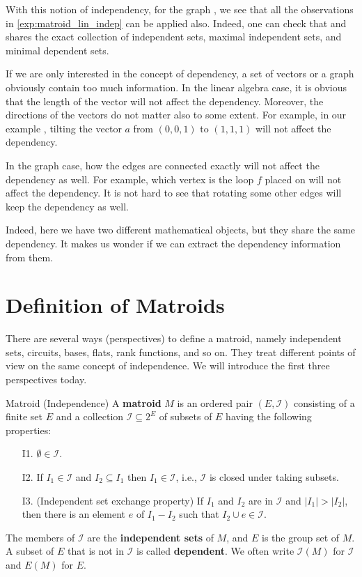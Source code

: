 \documentclass[a4paper,10pt]{article}
\renewcommand{\vocab}[1]{\textbf{#1}}
\newcommand{\II}{\mathcal{I}}
\begin{document}
With this notion of independency, for the graph , we see that all the observations in \cref{exp:matroid_lin_indep} can be applied also. Indeed, one can check that  and  shares the exact collection of independent sets, maximal independent sets, and minimal dependent sets.


If we are only interested in the concept of dependency, a set of vectors or a graph obviously contain too much information. In the linear algebra case, it is obvious that the length of the vector will not affect the dependency. Moreover, the directions of the vectors do not matter also to some extent. For example, in our example , tilting the vector $a$ from $(0,0,1)$ to $(1,1,1)$ will not affect the dependency. 

In the graph case, how the edges are connected exactly will not affect the dependency as well. For example, which vertex is the loop $f$ placed on will not affect the dependency. It is not hard to see that rotating some other edges will keep the dependency as well.

Indeed, here we have two different mathematical objects, but they share the same dependency. It makes us wonder if we can extract the dependency information from them.

\section{Definition of Matroids}

There are several ways (perspectives) to define a matroid, namely independent sets, circuits, bases, flats, rank functions, and so on. They treat different points of view on the same concept of independence. We will introduce the first three perspectives today.


\begin{definition}{Matroid (Independence)}
  A \vocab{matroid} $M$ is an ordered pair $(E,\II)$ consisting of a finite set $E$ and a collection $\II\subseteq 2^E$ of subsets of $E$ having the following properties:
  \begin{enumerate}
    \item [I1.] $\emptyset \in \II$.
    \item [I2.] If $I_1\in \II$ and $I_2\subseteq I_1$ then $I_1\in \II$, i.e., $\II$ is closed under taking subsets.
    \item [I3.] (Independent set exchange property) If $I_1$ and $I_2$ are in $\II$ and $|I_1|>|I_2|$, then there is an element $e$ of $I_1-I_2$ such that $I_2\cup e\in \II$.
  \end{enumerate}
  The members of $\II$ are the \vocab{independent sets} of $M$, and $E$ is the group set of $M$. A subset of $E$ that is not in $\II$ is called \textbf{dependent}. We often write $\II(M)$ for $\II$ and $E(M)$ for $E$.
\end{definition}
\end{document}
